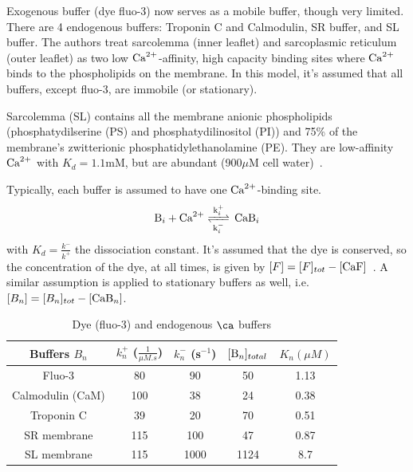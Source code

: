 Exogenous buffer (dye fluo-3) now serves as a mobile buffer, though very
limited. There are 4 endogenous buffers: Troponin C and Calmodulin, SR buffer,
and SL buffer. The authors treat sarcolemma (inner leaflet) and sarcoplasmic
reticulum (outer leaflet) as two low ${\text{Ca}^{2+}}$-affinity, high capacity binding sites
where ${\text{Ca}^{2+}}$ binds to the phospholipids on the membrane. In this model, it's
assumed that all buffers, except fluo-3, are immobile (or stationary).

\begin{framed}
  Sarcolemma (SL) contains all the membrane anionic phospholipids
  (phosphatydilserine (PS) and phosphatydilinositol (PI)) and 75\% of
  the membrane's zwitterionic phosphatidylethanolamine (PE). They are
  low-affinity ${\text{Ca}^{2+}}$ with $K_d=1.1$mM, but are abundant (900$\mu$M
  cell water)~\citep{langer1996}. 
\end{framed}


Typically, each buffer is assumed to have one ${\text{Ca}^{2+}}$-binding site.
\begin{equation}
  \label{eq:954}
 \ce{ B_i + \Ca \ce{<=>[k^+_{i}][k^-_{i}]} CaB_i}
\end{equation}
with $K_d=\frac{k^-}{k^+}$ the dissociation constant.  It's assumed that the dye
is conserved, so the concentration of the dye, at all times, is given by $[F] =
[F]_{tot}-[\ce{CaF}]$~\citep{wagner1994erb}. A similar assumption is applied to
stationary buffers as well, i.e.  $[B_n] =[B_n]_{tot}-[\ce{CaB_n}]$.


\begin{table}[hbt]
  \begin{center}
    \caption{Dye (fluo-3) and endogenous $\ca$ buffers}
    \begin{tabular}{ccccc} 
      \hline
      Buffers $B_n$ & $k^+_n$ ($\frac{1}{\mu M.s}$) & $k^-_n$ (s$^{-1}$) &
      $[\ce{B_n}]_{total}$  & $K_n (\mu M)$ \\ 
      \hline\hline
      Fluo-3 & 80  & 90 & 50 & 1.13 \\
      Calmodulin (CaM) & 100 & 38 & 24 & 0.38 \\
      Troponin C & 39 & 20 & 70 & 0.51 \\
      SR membrane & 115 & 100 & 47 & 0.87\\
      SL membrane & 115 & 1000 & 1124 & 8.7 \\
    \end{tabular}
  \end{center}
  \label{tab:Smith_98_Fluo3}
\end{table}

